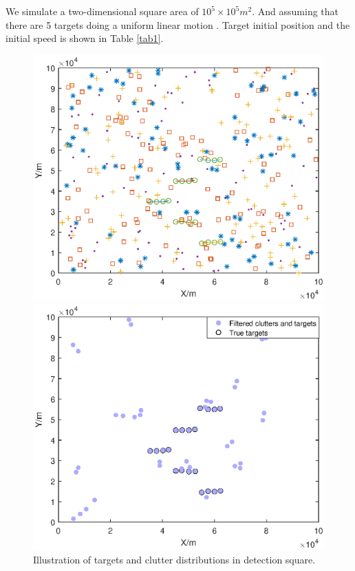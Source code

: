 \documentclass[default,iicol]{sn-jnl}%
\theoremstyle{thmstyleone}%
\theoremstyle{thmstyletwo}%
\theoremstyle{thmstylethree}%
\begin{document}
We simulate a two-dimensional square area of $10 ^ { 5 } \times 10 ^ { 5 }   m ^ { 2 }$. And assuming that there are 5 targets doing a uniform linear motion \cite{bib20}. Target initial position and the initial speed is shown in Table \ref{tab1}.
\begin{figure}[hb]%
    \vspace{-0.5cm}
    \begin{minipage}[b]{0.245\textwidth}
        \hspace{-1.3cm}
        \includegraphics[width=1.2\linewidth]{fig8.eps}
        \caption{Illustration of targets and clutter distributions in detection square.}\label{fig8}
    \end{minipage}
    \begin{minipage}[b]{0.245\textwidth}
        \hspace{-10mm}
        \includegraphics[width=1.2\linewidth]{fig9.eps}

\end{minipage}
\end{figure}
\end{document}
